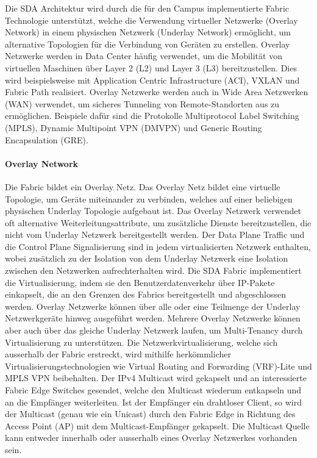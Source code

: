 Die SDA Architektur wird durch die für den Campus implementierte Fabric Technologie unterstützt, welche die Verwendung virtueller Netzwerke (Overlay Network) in einem physischen Netzwerk (Underlay Network) ermöglicht, um alternative Topologien für die Verbindung von Geräten zu erstellen. Overlay Netzwerke werden in Data Center häufig verwendet, um die Mobilität von virtuellen Maschinen über Layer 2 (L2) und Layer 3 (L3) bereitzustellen. Dies wird beispielsweise mit Application Centric Infrastructure (ACI), VXLAN und Fabric Path realisiert. Overlay Netzwerke werden auch in Wide Area Netzwerken (WAN) verwendet, um sicheres Tunneling von Remote-Standorten aus zu ermöglichen. Beispiele dafür sind die Protokolle Multiprotocol Label Switching (MPLS), Dynamic Multipoint VPN (DMVPN) und Generic Routing Encapsulation (GRE). \cite{sda-designguide}

\paragraph{Overlay Network}
Die Fabric bildet ein Overlay Netz. Das Overlay Netz bildet eine virtuelle Topologie, um Geräte miteinander zu verbinden, welches auf einer beliebigen physischen Underlay Topologie aufgebaut ist. Das Overlay Netzwerk verwendet oft alternative Weiterleitungsattribute, um zusätzliche Dienste bereitzustellen, die nicht vom Underlay Netzwerk bereitgestellt werden. 
Der Data Plane Traffic und die Control Plane Signalisierung sind in jedem virtualisierten Netzwerk enthalten, wobei zusätzlich zu der Isolation von dem Underlay Netzwerk eine Isolation zwischen den Netzwerken aufrechterhalten wird. Die SDA Fabric implementiert die Virtualisierung, indem sie den Benutzerdatenverkehr über IP-Pakete einkapselt, die an den Grenzen des Fabrics bereitgestellt und abgeschlossen werden.
Overlay Netzwerke können über alle oder eine Teilmenge der Underlay Netzwerkgeräte hinweg ausgeführt werden. Mehrere Overlay Netzwerke können aber auch über das gleiche Underlay Netzwerk laufen, um Multi-Tenancy durch Virtualisierung zu unterstützen. Die Netzwerkvirtualisierung, welche sich ausserhalb der Fabric erstreckt, wird mithilfe herkömmlicher Virtualisierungstechnologien wie Virtual Routing and Forwarding (VRF)-Lite und MPLS VPN beibehalten.
Der IPv4 Multicast wird gekapselt und an interessierte Fabric Edge Switches gesendet, welche den Multicast wiederum entkapseln und an die Empfänger weiterleiten. Ist der Empfänger ein drahtloser Client, so wird der Multicast (genau wie ein Unicast) durch den Fabric Edge in Richtung des Access Point (AP) mit dem Multicast-Empfänger gekapselt. Die Multicast Quelle kann entweder innerhalb oder ausserhalb eines Overlay Netzwerkes vorhanden sein. \cite{sda-designguide}

